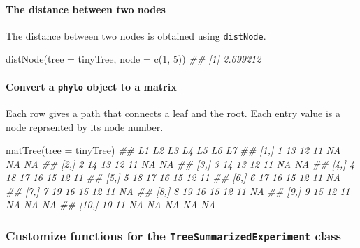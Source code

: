 \documentclass[]{article}
\newcommand{\hlnum}[1]{\textcolor[rgb]{0.816,0.125,0.439}{#1}}%
\newcommand{\hlcom}[1]{\textcolor[rgb]{0.502,0.502,0.502}{\textit{#1}}}%
\newcommand{\hlstd}[1]{\textcolor[rgb]{0.251,0.251,0.251}{#1}}%
\newcommand{\hlkwc}[1]{\textcolor[rgb]{0.251,0.251,0.251}{#1}}%
\newcommand{\hlkwd}[1]{\textcolor[rgb]{0.878,0.439,0.125}{#1}}%
\newenvironment{Shaded}{\begin{myshaded}}{\end{myshaded}}
\newcommand{\KeywordTok}[1]{\hlkwd{#1}}
\newcommand{\DataTypeTok}[1]{\hlkwc{#1}}
\newcommand{\DecValTok}[1]{\hlnum{#1}}
\newcommand{\CommentTok}[1]{\hlcom{#1}}
\newcommand{\NormalTok}[1]{\hlstd{#1}}
\begin{document}
\hypertarget{the-distance-between-two-nodes}{%
\paragraph{The distance between two nodes}\label{the-distance-between-two-nodes}}

The distance between two nodes is obtained using \texttt{distNode}.

\begin{Shaded}
\begin{Highlighting}[]
\KeywordTok{distNode}\NormalTok{(}\DataTypeTok{tree =}\NormalTok{ tinyTree, }\DataTypeTok{node =} \KeywordTok{c}\NormalTok{(}\DecValTok{1}\NormalTok{, }\DecValTok{5}\NormalTok{))}
\CommentTok{## [1] 2.699212}
\end{Highlighting}
\end{Shaded}

\hypertarget{convert-a-phylo-object-to-a-matrix}{%
\paragraph{\texorpdfstring{Convert a \texttt{phylo} object to a matrix}{Convert a phylo object to a matrix}}\label{convert-a-phylo-object-to-a-matrix}}

Each row gives a path that connects a leaf and the root. Each entry value is a node reprsented by its node number.

\begin{Shaded}
\begin{Highlighting}[]
\KeywordTok{matTree}\NormalTok{(}\DataTypeTok{tree =}\NormalTok{ tinyTree)}
\CommentTok{##       L1 L2 L3 L4 L5 L6 L7}
\CommentTok{##  [1,]  1 13 12 11 NA NA NA}
\CommentTok{##  [2,]  2 14 13 12 11 NA NA}
\CommentTok{##  [3,]  3 14 13 12 11 NA NA}
\CommentTok{##  [4,]  4 18 17 16 15 12 11}
\CommentTok{##  [5,]  5 18 17 16 15 12 11}
\CommentTok{##  [6,]  6 17 16 15 12 11 NA}
\CommentTok{##  [7,]  7 19 16 15 12 11 NA}
\CommentTok{##  [8,]  8 19 16 15 12 11 NA}
\CommentTok{##  [9,]  9 15 12 11 NA NA NA}
\CommentTok{## [10,] 10 11 NA NA NA NA NA}
\end{Highlighting}
\end{Shaded}

\hypertarget{modifyLink}{%
\subsubsection{\texorpdfstring{Customize functions for the \texttt{TreeSummarizedExperiment} class}{Customize functions for the TreeSummarizedExperiment class}}\label{modifyLink}}
\end{document}
